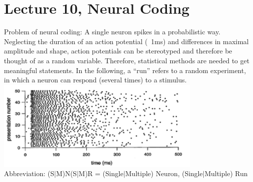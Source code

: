 \section{Lecture 10, Neural Coding}
Problem of neural coding: A single neuron spikes in a probabilistic way. Neglecting the duration of an action potential (~1ms) and differences in maximal amplitude and shape, action potentials can be stereotyped and therefore be thought of as a random variable. Therefore, statistical methods are needed to get meaningful statements. In the following, a ``run'' refers to a random experiment, in which a neuron can respond (several times) to a stimulus.
\includegraphics[width=10cm]{neuroinf_spikeruns.png}\\
Abbreviation: (S$|$M)N(S$|$M)R = (Single$|$Multiple) Neuron, (Single$|$Multiple) Run\\

